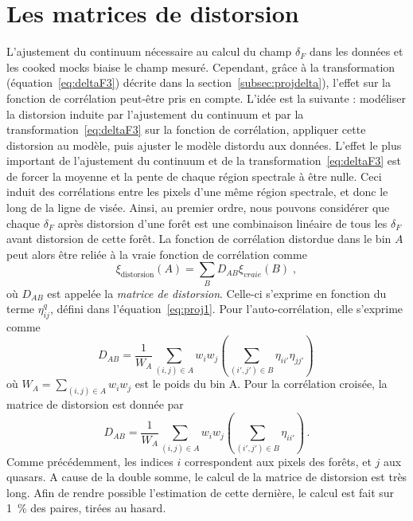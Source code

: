 \section{Les matrices de distorsion}
\label{sec:calcul_dmat}
L'ajustement du continuum nécessaire au calcul du champ $\delta_F$ dans les données et les cooked mocks biaise le champ mesuré. Cependant, grâce à la transformation (équation~\ref{eq:deltaF3}) décrite dans la section~\ref{subsec:projdelta}), l'effet sur la fonction de corrélation peut-être pris en compte.
L'idée est la suivante : modéliser la distorsion induite par l'ajustement du continuum et par la transformation~\ref{eq:deltaF3} sur la fonction de corrélation, appliquer cette distorsion au modèle, puis ajuster le modèle \og distordu \fg aux données.
L'effet le plus important de l'ajustement du continuum et de la transformation~\ref{eq:deltaF3} est de forcer la moyenne et la pente de chaque région spectrale à être nulle. Ceci induit des corrélations entre les pixels d'une même région spectrale, et donc le long de la ligne de visée.
Ainsi, au premier ordre, nous pouvons considérer que chaque $\delta_F$ après distorsion d'une forêt est une combinaison linéaire de tous les $\delta_F$ avant distorsion de cette forêt.
La fonction de corrélation distordue dans le bin $A$ peut alors être reliée à la vraie fonction de corrélation comme
\begin{equation}
  \xi_{\mathrm{distorsion}}(A) = \sum_{B} D_{AB}\xi_{vraie}(B) \; , 
\end{equation}
où $D_{AB}$ est appelée la \emph{matrice de distorsion}. Celle-ci s'exprime en fonction du terme $\eta_{ij}^q$, défini dans l'équation~\ref{eq:proj1}. Pour l'auto-corrélation, elle s'exprime comme
\begin{equation}
  \label{eq:dmat}
  D_{AB} = \frac{1}{W_A} \sum_{(i,j)\in A} w_i w_j \left( \sum_{(i',j')\in B} \eta_{ii'} \eta_{jj'} \right) \,
\end{equation}
où $W_{A} = \sum_{(i,j)\in A} w_i w_j$ est le poids du bin A. Pour la corrélation croisée, la matrice de distorsion est donnée par
\begin{equation}
  \label{eq:xdmat}
  D_{AB} = \frac{1}{W_A} \sum_{(i,j)\in A} w_i w_j \left( \sum_{(i',j')\in B} \eta_{ii'} \right) \, .
\end{equation}
Comme précédemment, les indices $i$ correspondent aux pixels des forêts, et $j$ aux quasars. A cause de la double somme, le calcul de la matrice de distorsion est très long. Afin de rendre possible l'estimation de cette dernière, le calcul est fait sur \SI{1}{\percent} des paires, tirées au hasard.

